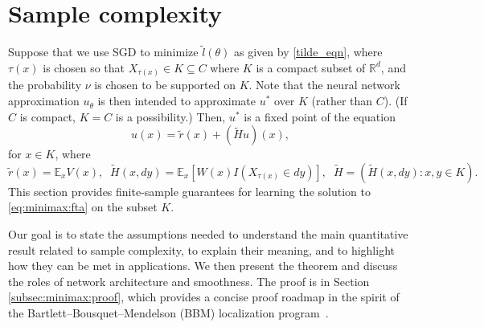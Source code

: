 \documentclass[pdflatex,sn-mathphys-ay]{sn-jnl}%
\numberwithin{equation}{section}
\newcommand\sbk[1]{\left[#1\right]}
\newcommand{\E}{\mathbb{E}}
\newcommand{\R}{\mathbb{R}}
\theoremstyle{thmstyleone}%
\theoremstyle{thmstyletwo}%
\theoremstyle{thmstylethree}%
\begin{document}
\section{Sample complexity}
\label{subsec:minimax}

\providecommand{\Rad}{\mathfrak{R}}
\providecommand{\Pdim}{\operatorname{Pdim}}

Suppose that we use SGD to minimize $\tilde{l}(\theta)$ as given by \eqref{tilde_eqn}, where $\tau(x)$ is chosen so that $X_{\tau(x)}\in K\subseteq C$ where $K$ is a compact subset of $\R^d$, and the probability $\nu$ is chosen to be supported on $K$. Note that the neural network approximation $u_\theta$ is then intended to approximate $u^*$ over $K$ (rather than $C$). (If $C$ is compact, $K=C$ is a possibility.) Then, $u^*$ is a fixed point of the equation
\begin{equation}
\label{eq:minimax:fta}
u(x)=\tilde{r}(x)+(\tilde{H}u)(x),
\end{equation}
for $x\in K$, where
\[
    \tilde{r}(x)=\E_x V(x),\;\;\tilde{H}(x,dy)=\E_x \sbk{W(x)I(X_{\tau(x)}\in dy)},\;\;\tilde{H}=(\tilde{H}(x,dy):x,y\in K).
\]
This section provides finite-sample guarantees for learning the solution to \eqref{eq:minimax:fta} on the subset $K$.

Our goal is to state the assumptions needed to understand the main quantitative result related to sample complexity, to explain their meaning, and to highlight how they can be met in applications.  We then present the theorem and discuss the roles of network architecture and smoothness. The proof is in Section \ref{subsec:minimax:proof}, which provides a concise proof roadmap in the spirit of the Bartlett–Bousquet–Mendelson (BBM) localization program~\cite{bartlett2005local,koltchinskii2006local}.
\end{document}
